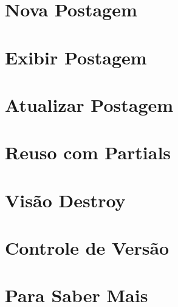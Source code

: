 \documentclass[t, 				             
			   final,
			   12pt, 				         
			   xcolor={usenames,dvipsnames}, 
			   table]{beamer}
\begin{document}
	
	
	  	

    \section{Nova Postagem}
        
        
    \section{Exibir Postagem}
        
    \section{Atualizar Postagem}
        
    \section{Reuso com Partials}
        
        
        
    \section{Visão Destroy}
        
    \section{Controle de Versão}
        
    
    \section{Para Saber Mais}
        
\end{document}
